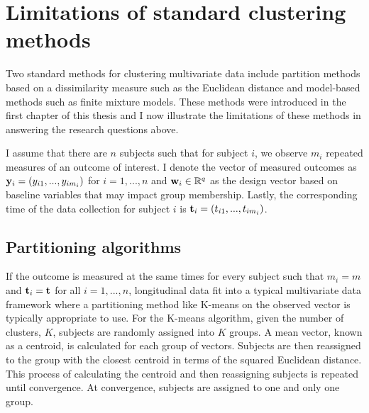 \section{Limitations of standard clustering methods}
Two standard methods for clustering multivariate data include partition methods based on a dissimilarity measure such as the Euclidean distance and model-based methods such as finite mixture models. These methods were introduced in the first chapter of this thesis and I now illustrate the limitations of these methods in answering the research questions above. 

I assume that there are $n$ subjects such that for subject $i$, we observe $m_{i}$ repeated measures of an outcome of interest. I denote the vector of measured outcomes as $\mathbf y_{i}=(y_{i1},...,y_{im_{i}})$ for $i=1,...,n$ and $\mathbf w_{i}\in \mathbb{R}^{q}$ as the design vector based on baseline variables that may impact group membership. Lastly, the corresponding time of the data collection for subject $i$ is $\mathbf t_{i}=(t_{i1},...,t_{im_{i}})$. 

\subsection{Partitioning algorithms}
If the outcome is measured at the same times for every subject such that $m_{i}=m$ and $\mathbf t_{i}=\mathbf t$ for all $i=1,...,n$, longitudinal data fit into a typical multivariate data framework where a partitioning method like K-means \cite{macqueen1967, hartigan1979} on the observed vector is typically appropriate to use. For the K-means algorithm, given the number of clusters, $K$, subjects are randomly assigned into $K$ groups. A mean vector, known as a centroid, is calculated for each group of vectors. Subjects are then reassigned to the group with the closest centroid in terms of the squared Euclidean distance. This process of calculating the centroid and then reassigning subjects is repeated until convergence. At convergence, subjects are assigned to one and only one group. 

